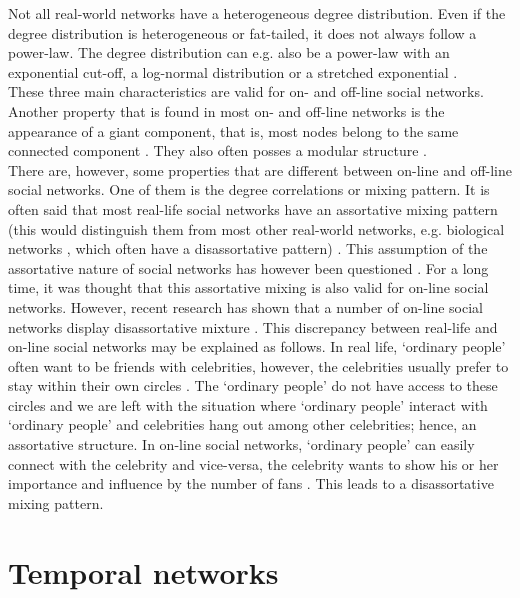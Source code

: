 \documentclass[11 pt , letterpaper , twoside , openright]{book}
\begin{document}
\newline
Not all real-world networks have a heterogeneous degree distribution. Even if the degree distribution is heterogeneous or fat-tailed, it does not always follow a power-law. The degree distribution can e.g. also be a power-law with an exponential cut-off, a log-normal distribution or a stretched exponential \cite{Newman2005}.\\
\newline
These three main characteristics are valid for on- and off-line social networks. Another property that is found in most on- and off-line networks is the appearance of a giant component, that is, most nodes belong to the same connected component \cite{Latapy}. They also often posses a modular structure \cite{Ferrara2012}\cite{McGlohon2011}. \\
\newline
There are, however, some properties that are different between on-line and off-line social networks. One of them is the degree correlations or mixing pattern. It is often said that most real-life social networks have an assortative mixing pattern (this would distinguish them from most other real-world networks, e.g. biological networks \cite{F.Costa2007}, which often have a disassortative pattern) \cite{Fisher2017}\cite{Hu2009}\cite{Zhang2014}. This assumption of the assortative nature of social networks has however been questioned \cite{Fisher2017}\cite{Whitney2010}. For a long time, it was thought that this assortative mixing is also valid for on-line social networks. However, recent research has shown that a number of on-line social networks display disassortative mixture \cite{Holme2004}\cite{Hu2009}\cite{Zhang2014}. This discrepancy between real-life and on-line social networks may be explained as follows. In real life, `ordinary people' often want to be friends with celebrities, however, the celebrities usually prefer to stay within their own circles \cite{Hu2009}\cite{Zhang2014}. The `ordinary people' do not have access to these circles and we are left with the situation where `ordinary people' interact with `ordinary people' and celebrities hang out among other celebrities; hence, an assortative structure. In on-line social networks, `ordinary people' can easily connect with the celebrity and vice-versa, the celebrity wants to show his or her importance and influence by the number of fans \cite{Hu2009}\cite{Zhang2014}. This leads to a disassortative mixing pattern.

\section{Temporal networks}
\end{document}
